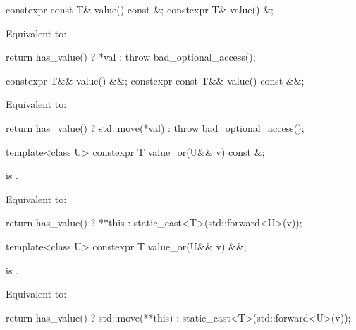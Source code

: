 %
\begin{itemdecl}
constexpr const T& value() const &;
constexpr T& value() &;
\end{itemdecl}

\begin{itemdescr}
\pnum
\effects
Equivalent to:
\begin{codeblock}
return has_value() ? *val : throw bad_optional_access();
\end{codeblock}
\end{itemdescr}

%
\begin{itemdecl}
constexpr T&& value() &&;
constexpr const T&& value() const &&;
\end{itemdecl}

\begin{itemdescr}

\pnum
\effects
Equivalent to:
\begin{codeblock}
return has_value() ? std::move(*val) : throw bad_optional_access();
\end{codeblock}
\end{itemdescr}

%
\begin{itemdecl}
template<class U> constexpr T value_or(U&& v) const &;
\end{itemdecl}

\begin{itemdescr}
\pnum
\mandates
{} is .

\pnum
\effects
Equivalent to:
\begin{codeblock}
return has_value() ? **this : static_cast<T>(std::forward<U>(v));
\end{codeblock}
\end{itemdescr}

%
\begin{itemdecl}
template<class U> constexpr T value_or(U&& v) &&;
\end{itemdecl}

\begin{itemdescr}
\pnum
\mandates
{} is .

\pnum
\effects
Equivalent to:
\begin{codeblock}
return has_value() ? std::move(**this) : static_cast<T>(std::forward<U>(v));
\end{codeblock}
\end{itemdescr}

